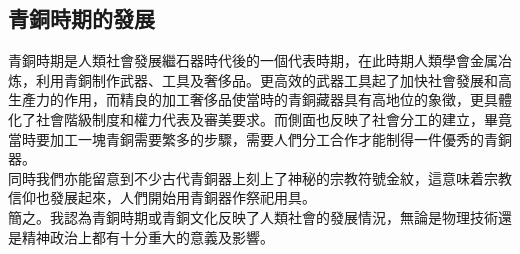 \documentclass[supercite]{Experimental_Report}
\theoremstyle{definition}
\begin{document}
	\subsection{青銅時期的發展}
	青銅時期是人類社會發展繼石器時代後的一個代表時期，在此時期人類學會金属冶炼，利用青銅制作武器、工具及奢侈品。更高效的武器工具起了加快社會發展和高生產力的作用，而精良的加工奢侈品使當時的青銅藏器具有高地位的象徵，更具體化了社會階級制度和權力代表及審美要求。而側面也反映了社會分工的建立，畢竟當時要加工一塊青銅需要繁多的步驟，需要人們分工合作才能制得一件優秀的青銅器。\\同時我們亦能留意到不少古代青銅器上刻上了神秘的宗教符號金紋，這意味着宗教信仰也發展起來，人們開始用青銅器作祭祀用具。
	\\簡之。我認為青銅時期或青銅文化反映了人類社會的發展情況，無論是物理技術還是精神政治上都有十分重大的意義及影響。
	
	
\end{document}
